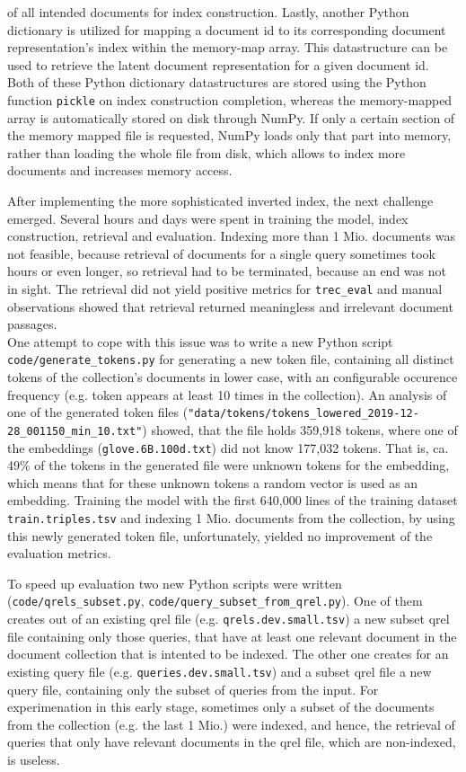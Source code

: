     of all intended documents for index construction.
Lastly, another Python dictionary is utilized for mapping a document id to its corresponding document representation's index within the memory-map array.
This datastructure can be used to retrieve the latent document representation for a given document id.
Both of these Python dictionary datastructures are stored using the Python function \texttt{pickle} on index construction completion,
    whereas the memory-mapped array is automatically stored on disk through NumPy.
If only a certain section of the memory mapped file is requested, NumPy loads only that part into memory, rather than loading the whole file from disk,
    which allows to index more documents and increases memory access.

After implementing the more sophisticated inverted index, the next challenge emerged.
Several hours and days were spent in training the model, index construction, retrieval and evaluation.
Indexing more than 1 Mio. documents was not feasible, because retrieval of documents for a single query sometimes took hours or even longer, so
    retrieval had to be terminated, because an end was not in sight.
The retrieval did not yield positive metrics for \verb|trec_eval| and manual observations showed that retrieval returned meaningless and irrelevant 
    document passages.\\
One attempt to cope with this issue was to write a new Python script \verb|code/generate_tokens.py| for generating a new token file, 
    containing all distinct tokens of the collection's documents in lower case, with an configurable occurence frequency 
    (e.g. token appears at least 10 times in the collection).
An analysis of one of the generated token files (\verb|"data/tokens/tokens_lowered_2019-12-28_001150_min_10.txt"|) showed,
    that the file holds 359,918 tokens, where one of the embeddings (\verb|glove.6B.100d.txt|) did not know 177,032 tokens.
That is, ca. 49\% of the tokens in the generated file were unknown tokens for the embedding,
    which means that for these unknown tokens a random vector is used as an embedding.
Training the model with the first 640,000 lines of the training dataset \verb|train.triples.tsv| and
    indexing 1 Mio. documents from the collection,
    by using this newly generated token file, unfortunately, yielded no improvement of the evaluation
    metrics.

To speed up evaluation two new Python scripts were written
    (\verb|code/qrels_subset.py|, \verb|code/query_subset_from_qrel.py|).
One of them creates out of an existing qrel file (e.g. \verb|qrels.dev.small.tsv|)
    a new subset qrel file containing only those queries, that have at least one 
    relevant document in the document collection that is intented to be indexed.
The other one creates for an existing query file (e.g. \verb|queries.dev.small.tsv|)
    and a subset qrel file a new query file, containing only the subset of queries from the input.
For experimenation in this early stage, sometimes only a subset of the documents from the 
    collection (e.g. the last 1 Mio.) were indexed, and hence, 
    the retrieval of queries that only have relevant documents in the qrel file, which are non-indexed,
    is useless.

